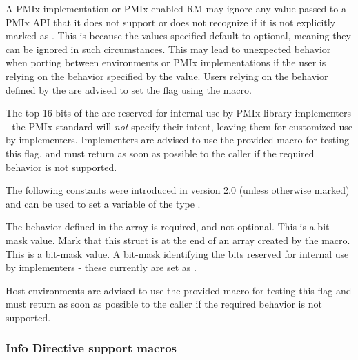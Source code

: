 \adviceuserstart
A PMIx implementation or PMIx-enabled \ac{RM} may ignore any  value passed to a \ac{PMIx} \ac{API} that it does not support or does not recognize if it is not explicitly marked as .
This is because the values specified default to optional, meaning they can be ignored in such circumstances.
This may lead to unexpected behavior when porting between environments or \ac{PMIx} implementations if the user is relying on the behavior specified by the  value.
Users relying on the behavior defined by the  are advised to set the  flag using the  macro.
\adviceuserend

\adviceimplstart
The top 16-bits of the  are reserved for internal use by \ac{PMIx} library implementers - the \ac{PMIx} standard will \textit{not} specify their intent, leaving them for customized use by implementers. Implementers are advised to use the provided  macro for testing this flag, and must return  as soon as possible to the caller if the required behavior is not supported.
\adviceimplend

The following constants were introduced in version 2.0 (unless otherwise marked) and can be used to set a variable of the type .

\begin{constantdesc}
%
The behavior defined in the  array is required, and not optional. This is a bit-mask value.
%
Mark that this  struct is at the end of an array created by the  macro. This is a bit-mask value.
%
A bit-mask identifying the bits reserved for internal use by implementers - these currently are set as .
%
\end{constantdesc}

\advicermstart
Host environments are advised to use the provided  macro for testing this flag and must return  as soon as possible to the caller if the required behavior is not supported.
\advicermend


\subsubsection{Info Directive support macros}


